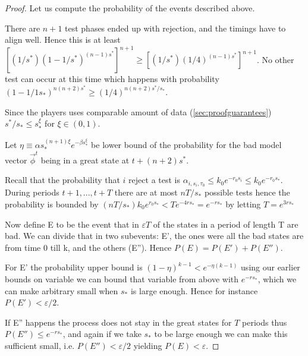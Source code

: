 \documentclass[]{spie}  %
\begin{document}
\begin{proof}
Let us compute the probability of the events described above. 

There are $n+1$ test phases ended up with rejection, and the timings have to align well. Hence this is at least $ [(1/s^*) (1-1/s^*)^{(n-1)s^*}]^{n+1} \geq [(1/s^*) (1/4)^{(n-1)s^*}]^{n+1}$. No other test can occur at this time which happens with probability $(1-1/1s_*)^{n(n+2)s^*} \geq (1/4)^{n(n+2)s^*/s_*}$. 

Since the players uses comparable amount of data (\autoref{sec:proofguarantees}) $s^*/s_* \leq s_*^\xi$ for $\xi \in (0,1)$. 

Let $\eta \equiv \alpha s_*^{(n+1)\xi}e^{-\beta s_*^\xi}$ be lower bound of the probability for the bad model vector $\overrightarrow{\phi}^t$ being in a great state at $t + (n+2)s^*$. 

Recall that the probability that $i$ reject a test is $\alpha_{i,s_i,\tau_0} \leq k_0e^{-r_0s_i} \leq k_0e^{-r_0s_*}$. During periods $t+1, ..., t+T$ there are at most $nT/s_*$ possible tests hence the probability  is bounded by $(nT/s_*)k_0e^{r_0s_*} < Te^{-4rs_*} = e^{-rs_*}$ by letting $T=e^{3rs_*}$ 

Now define E to be the event that in $\varepsilon T$ of the states in a period of length T are bad. We can divide that in two subevents: E', the ones were all the bad states are from time 0 till k, and the others (E''). Hence $P(E) = P(E')+P(E'')$.

For E' the probability upper bound is $(1 - \eta)^{k-1} < e^{-\eta(k-1)}$ using our earlier bounds on variable we can bound that variable from above with $e^{-rs_*}$, which we can make arbitrary small when $s_*$ is large enough. Hence for instance $P(E') < \varepsilon/2$.

If E'' happens the process does not stay in the great states for $T$ periods thus $P(E'')\leq e^{-rs_*}$, and again if we take $s_*$ to be large enough we can make this sufficient small, i.e. $P(E'') < \varepsilon/2$ yielding $P(E) < \varepsilon$.
\end{proof}
\end{document}
